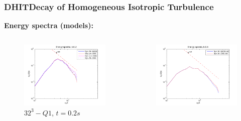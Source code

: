 \begin{frame}[t]
  \frametitle{DHIT{\small Decay of Homogeneous Isotropic Turbulence}}
  \textbf{Energy spectra (models):}
  \vspace*{-1.0cm}
  \begin{columns}
  \begin{column}{0.5\textwidth}
  \begin{figure}
    \centering	
    \includegraphics[width=1.1\textwidth]{Figures/spec_32_02_scaled}
    \vspace*{-0.8cm}
    \caption{$32^3-Q1$, $t=0.2s$}
  \end{figure}
  \end{column}
  \begin{column}{0.5\textwidth}
    \begin{figure}
    \centering	
    \includegraphics[width=1.1\textwidth]{Figures/spec_64_08}

\end{figure}
\end{column}
\end{columns}
\end{frame}
